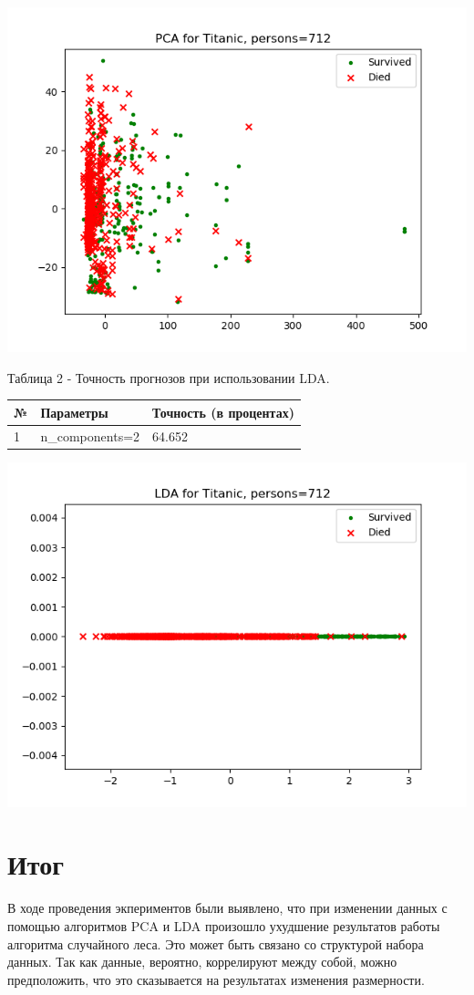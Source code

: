 \documentclass[a4paper,12pt]{article}
\begin{document}
\includegraphics[scale=1]{PCA.png}


\vspace{0.5cm}
	Таблица 2 - Точность прогнозов  при использовании LDA.
\begin{longtable}{|p{1cm}|p{9cm}|p{3cm}|}
\hline
№ & Параметры & Точность (в процентах) \\ 
\hline 
1 & n\_components=2 & 64.652 \\
\hline
\end{longtable}

\includegraphics[scale=1]{LDA.png}


\newpage\section{Итог}
	В ходе проведения экпериментов были выявлено, что при изменении данных с помощью алгоритмов PCA и LDA произошло ухудшение результатов работы алгоритма случайного леса. Это может быть связано со структурой набора данных. Так как данные, вероятно, коррелируют между собой, можно предположить, что это сказывается на результатах изменения размерности.
	
\end{document}
